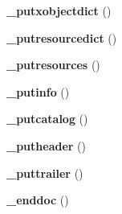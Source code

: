 \begin{DoxyCompactItemize}
\item 
{\bfseries \+\_\+putxobjectdict} ()\label{class_f_p_d_f_af867752b75e6f3ab801d04361af975a1}

\item 
{\bfseries \+\_\+putresourcedict} ()\label{class_f_p_d_f_ab8cbd28b1ef8067cd94b2ff742001889}

\item 
{\bfseries \+\_\+putresources} ()\label{class_f_p_d_f_acb19da5e6521ac1e0f3472a74f5674c3}

\item 
{\bfseries \+\_\+putinfo} ()\label{class_f_p_d_f_a6ae7e6d0a2180ed00042fb86d39c03ba}

\item 
{\bfseries \+\_\+putcatalog} ()\label{class_f_p_d_f_a02167c095457b931f89d6be819d33286}

\item 
{\bfseries \+\_\+putheader} ()\label{class_f_p_d_f_af225d15cefae5f606b0a1788414b279e}

\item 
{\bfseries \+\_\+puttrailer} ()\label{class_f_p_d_f_a856d3f96eb0a42747ed5090c89673279}

\item 
{\bfseries \+\_\+enddoc} ()\label{class_f_p_d_f_ad83ac6a1b1122bcf6fd1fee89e530257}

\end{DoxyCompactItemize}
